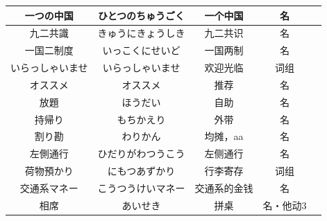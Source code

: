 \begin{longtable}{|c|c|c|c|c|}
    一つの中国 & ひとつのちゅうごく & 一个中国 & 名 & \\ \hline
    九二共識 & きゅうにきょうしき & 九二共识 & 名 & \\ \hline
    一国二制度 & いっこくにせいど & 一国两制 & 名 & \\ \hline
    いらっしゃいませ & いらっしゃいませ & 欢迎光临 & 词组 & \\ \hline
    オススメ & オススメ & 推荐 & 名 & \\ \hline
    放題 & ほうだい & 自助 & 名 & \\ \hline
    持帰り & もちかえり & 外带 & 名 & \\ \hline
    割り勘 & わりかん & 均摊，aa & 名 & \\ \hline
    左側通行 & ひだりがわつうこう & 左侧通行 & 名 & \\ \hline
    荷物預かり & にもつあずかり & 行李寄存 & 词组 & \\ \hline
    交通系マネー & こうつうけいマネー & 交通系的金钱 & 名 & \\ \hline
    相席 & あいせき & 拼桌 & 名・他动3 & \\ \hline
    
\end{longtable}

